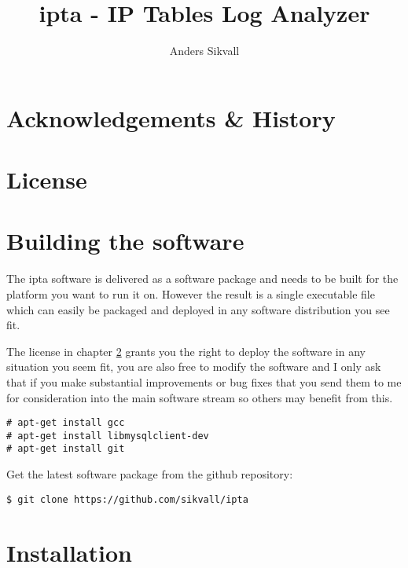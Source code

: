 \documentclass[10pt,a4paper]{report}
\author{Anders Sikvall}
\title{ipta - IP Tables Log Analyzer}
\begin{document}
\maketitle

\cleardoublepage

\tableofcontents

\chapter{Acknowledgements \& History}

\chapter{License}
\label{license}

\chapter{Building the software}

The ipta software is delivered as a software package and needs to be built for the platform you want to run it on. However the result is a single executable file which can easily be packaged and deployed in any software distribution you see fit. 

The license in chapter \ref{license} grants you the right to deploy the software in any situation you seem fit, you are also free to modify the software and I only ask that if you make substantial improvements or bug fixes that you send them to me for consideration into the main software stream so others may benefit from this.

\begin{verbatim}
# apt-get install gcc
# apt-get install libmysqlclient-dev
# apt-get install git
\end{verbatim}

Get the latest software package from the github repository:

\begin{verbatim}
$ git clone https://github.com/sikvall/ipta
\end{verbatim}


\chapter{Installation}
\end{document}
